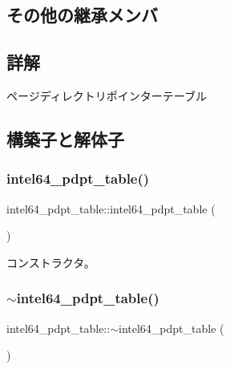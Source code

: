 \subsection*{その他の継承メンバ}


\subsection{詳解}
ページディレクトリポインターテーブル 

\subsection{構築子と解体子}
\hypertarget{classintel64__pdpt__table_a3cd9c879e84fce667318df399142efd4}{}\label{classintel64__pdpt__table_a3cd9c879e84fce667318df399142efd4} 
\subsubsection{\texorpdfstring{intel64\+\_\+pdpt\+\_\+table()}{intel64\_pdpt\_table()}\hspace{0.1cm}{\footnotesize\ttfamily [1/3]}}
{\footnotesize\ttfamily intel64\+\_\+pdpt\+\_\+table\+::intel64\+\_\+pdpt\+\_\+table (\begin{DoxyParamCaption}{ }\end{DoxyParamCaption})}

コンストラクタ。 \hypertarget{classintel64__pdpt__table_af88987688b73d5a7629df995fea538a9}{}\label{classintel64__pdpt__table_af88987688b73d5a7629df995fea538a9} 
\subsubsection{\texorpdfstring{$\sim$intel64\+\_\+pdpt\+\_\+table()}{~intel64\_pdpt\_table()}}
{\footnotesize\ttfamily intel64\+\_\+pdpt\+\_\+table\+::$\sim$intel64\+\_\+pdpt\+\_\+table (\begin{DoxyParamCaption}{ }\end{DoxyParamCaption})\hspace{0.3cm}{\ttfamily [virtual]}}

